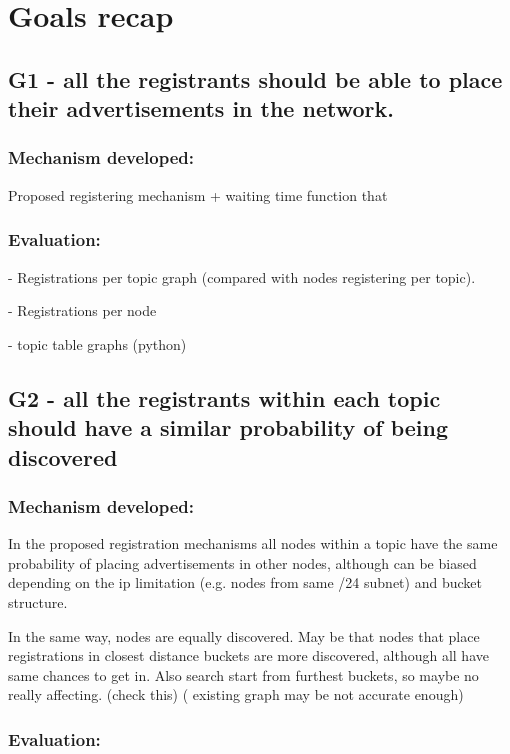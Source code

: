 \section{Goals recap}

\subsection{G1 - all the registrants  should be able to place their advertisements in the network.}

\subsubsection{Mechanism developed:} 

Proposed registering mechanism + waiting time function that 

\subsubsection{Evaluation: }


- Registrations per topic graph (compared with nodes registering per topic).  

- Registrations per node

- topic table graphs (python)

\subsection{G2 -  all the registrants within each topic should have a similar probability of being discovered}

\subsubsection{Mechanism developed:} 

In the proposed registration mechanisms all nodes within a topic have the same probability of placing advertisements in other nodes,  although can be biased depending on the ip limitation (e.g. nodes from same /24 subnet) and bucket structure.

In the same way,  nodes are equally discovered. 
May be that nodes that place registrations in closest distance buckets are more discovered, although all have same chances to get in. 
Also search start from furthest buckets,  so maybe no really affecting. 
 (check this)
 ( existing graph may be not accurate enough)

\subsubsection{Evaluation: }

